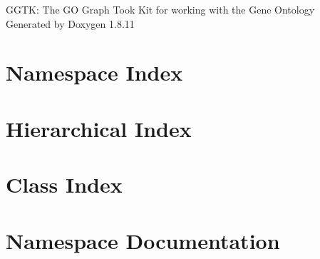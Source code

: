 \documentclass[twoside]{book}
\newcommand{\+}{\discretionary{\mbox{\scriptsize$\hookleftarrow$}}{}{}}
\newcommand{\clearemptydoublepage}{%
  \newpage{\pagestyle{empty}\cleardoublepage}%
}
\begin{document}
\hypersetup{pageanchor=false,
             bookmarksnumbered=true,
             pdfencoding=unicode
            }
\begin{titlepage}
\vspace*{7cm}
\begin{center}%
{\Large G\+G\+TK\+: The GO Graph Took Kit for working with the Gene Ontology }\\
\vspace*{1cm}
{\large Generated by Doxygen 1.8.11}\\
\end{center}
\end{titlepage}
\clearemptydoublepage
\tableofcontents
\clearemptydoublepage
{}
\hypersetup{pageanchor=true}

\chapter{Namespace Index}

\chapter{Hierarchical Index}

\chapter{Class Index}

\chapter{Namespace Documentation}





\end{document}
